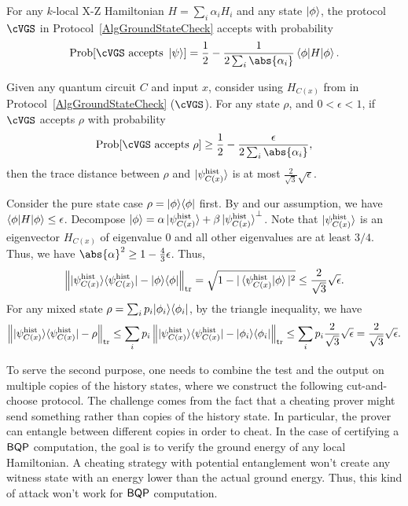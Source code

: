 \begin{lem}
    \label{thm:HamCheck}
    For any $k$-local X-Z Hamiltonian $H=\sum_i \alpha_{i} H_i$ and any state $\ket{\phi}$,
    the protocol $\cVGS$ in Protocol~\ref{AlgGroundStateCheck} accepts with
    probability
\begin{equation}
 \mathrm{Prob}[ \cVGS \text{ accepts } \ket{\psi}] = \frac{1}{2} - \frac{1}{2 \sum_i \abs{\alpha_i}}\braket{\phi|H|\phi}.
\end{equation}
\end{lem}

\begin{theorem} \label{thm:HamCheckClose}
Given any quantum circuit $C$ and input $x$, consider using $H_{C(x)}$ from  in Protocol~\ref{AlgGroundStateCheck} ($\cVGS$).
For any state $\rho$, and $0< \epsilon < 1$, if $\cVGS$ accepts $\rho$ with probability
\[
 \mathrm{Prob}[\cVGS \text{ accepts } \rho] \geq \frac{1}{2} - \frac{\epsilon}{2 \sum_i \abs{\alpha_i}},
\]
then the trace distance between $\rho$ and $\ket{\psi_{C(x)}^{\mathrm{hist}}}$ is at most $\frac{2}{\sqrt{3}}\sqrt{\epsilon}$.
\end{theorem}

\begin{prf} Consider the pure state case $\rho=|\phi\rangle\langle \phi|$ first. By  and our assumption, we have $\braket{\phi|H|\phi} \leq \epsilon$.
Decompose $\ket{\phi}= \alpha \ket{\psi_{C(x)}^{\mathrm{hist}}} + \beta \ket{\psi_{C(x)}^{\mathrm{hist}}}^\bot$. Note that $\ket{\psi_{C(x)}^{\mathrm{hist}}}$ is an eigenvector $H_{C(x)}$ of eigenvalue 0 and all other eigenvalues are at least $3/4$. Thus, we have $\abs{\alpha}^2 \geq 1-\frac{4}{3}\epsilon$. Thus,
\[
   \left\lVert|\psi^{\mathrm{hist}}_{C(x)}\rangle\langle \psi^{\mathrm{hist}}_{C(x)}|- |\phi\rangle\langle \phi|\right\rVert_{\operatorname{tr}} = \sqrt{1- |\braket{\psi^{\mathrm{hist}}_{C(x)}|\phi}|^2}
   \leq \frac{2}{\sqrt{3}}\sqrt{\epsilon}.
\]
For any mixed state $\rho=\sum_i p_i |\phi_i\rangle\langle \phi_i|$, by the triangle inequality, we have
\[
    \left\lVert|\psi^{\mathrm{hist}}_{C(x)}\rangle\langle \psi^{\mathrm{hist}}_{C(x)}|- \rho\right\rVert_{\operatorname{tr}} \leq \sum_i p_i    \left\lVert|\psi^{\mathrm{hist}}_{C(x)}\rangle\langle \psi^{\mathrm{hist}}_{C(x)}|- |\phi_i\rangle\langle \phi_i|\right\rVert_{\operatorname{tr}} \leq \sum_i p_i \frac{2}{\sqrt{3}} \sqrt{\epsilon} =\frac{2}{\sqrt{3}}\sqrt{\epsilon}.
\]
\end{prf}

To serve the second purpose, one needs to combine the test and the output on multiple copies of the history states, where we construct the following cut-and-choose protocol.  
The challenge comes from the fact that a cheating prover might send something rather than copies of the history state.
In particular, the prover can entangle between different copies in order to cheat.
In the case of certifying a $\operatorname{\mathsf{BQP}}$ computation, the goal is to verify the ground energy of any local Hamiltonian.
A cheating strategy with potential entanglement won't create any witness state with an energy lower than the actual ground energy.
Thus, this kind of attack won't work for $\operatorname{\mathsf{BQP}}$ computation.

